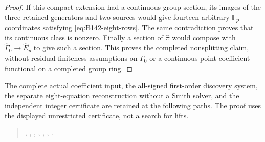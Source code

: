 \begin{proof}
If this compact extension had a continuous group section, its images
of the three retained generators and two sources would give fourteen
arbitrary $\mathbb F_p$ coordinates satisfying
\eqref{eq:B142-eight-rows}. The same contradiction proves that its
continuous class is nonzero. Finally a section of $\widehat\pi$
would compose with $\widehat\Gamma_0\to\widehat E_p$ to give
such a section. This proves the completed nonsplitting claim, without
residual-finiteness assumptions on $\Gamma_0$ or a continuous
point-coefficient functional on a completed group ring.
\end{proof}

The complete actual coefficient input, the all-signed first-order discovery
system, the separate eight-equation reconstruction without a Smith solver,
and the independent integer certificate are retained at the following paths.
The proof uses the displayed unrestricted certificate, not a search for lifts.
\begin{quote}\footnotesize\raggedright
{},
,
,
,
,
,
.
\end{quote}
